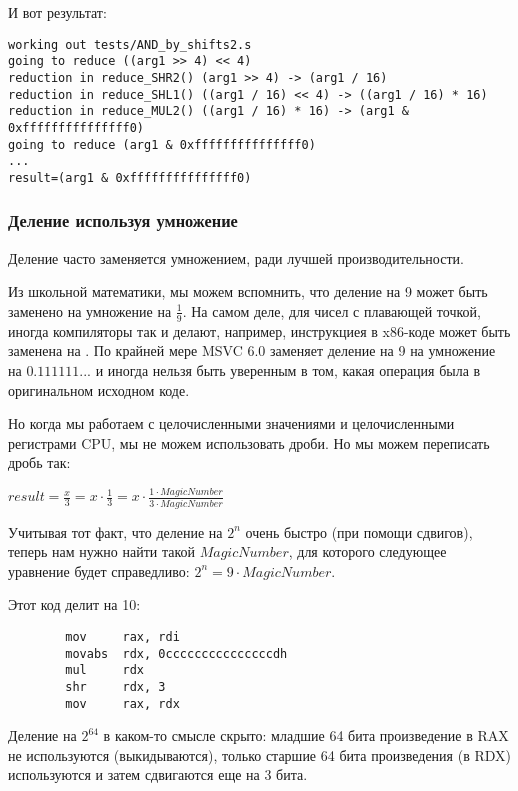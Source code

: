 И вот результат:

\begin{lstlisting}
working out tests/AND_by_shifts2.s
going to reduce ((arg1 >> 4) << 4)
reduction in reduce_SHR2() (arg1 >> 4) -> (arg1 / 16)
reduction in reduce_SHL1() ((arg1 / 16) << 4) -> ((arg1 / 16) * 16)
reduction in reduce_MUL2() ((arg1 / 16) * 16) -> (arg1 & 0xfffffffffffffff0)
going to reduce (arg1 & 0xfffffffffffffff0)
...
result=(arg1 & 0xfffffffffffffff0)
\end{lstlisting}

\subsubsection{Деление используя умножение}

Деление часто заменяется умножением, ради лучшей производительности.

Из школьной математики, мы можем вспомнить, что деление на 9 может быть заменено на умножение на $\frac{1}{9}$.
На самом деле, для чисел с плавающей точкой, иногда компиляторы так и делают,
например, инструкциея  в x86-коде может быть заменена на .
По крайней мере MSVC 6.0 заменяет деление на 9 на умножение на $0.111111...$ и иногда нельзя быть уверенным в том,
какая операция была в оригинальном исходном коде.

Но когда мы работаем с целочисленными значениями и целочисленными регистрами CPU, мы не можем использовать дроби.
Но мы можем переписать дробь так:

\begin{center}
{\large $result = \frac{x}{3} = x \cdot \frac{1}{3} = x \cdot \frac{1 \cdot MagicNumber}{3 \cdot MagicNumber}$}
\end{center}

Учитывая тот факт, что деление на $2^n$ очень быстро (при помощи сдвигов), теперь нам нужно найти такой $MagicNumber$,
для которого следующее уравнение будет справедливо: $2^n = 9 \cdot MagicNumber$.

Этот код делит на 10:

\begin{lstlisting}
        mov     rax, rdi
        movabs  rdx, 0cccccccccccccccdh
        mul     rdx
        shr     rdx, 3
        mov     rax, rdx
\end{lstlisting}

Деление на $2^{64}$ в каком-то смысле скрыто: младшие 64 бита произведение в RAX не используются (выкидываются),
только старшие 64 бита произведения (в RDX) используются и затем сдвигаются еще на 3 бита.

